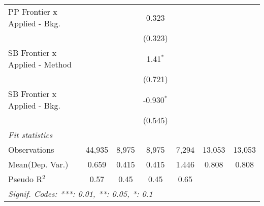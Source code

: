 \begin{tabular}{lcccccc}
   PP Frontier x Applied - Bkg.   &               &              & 0.323         &               &        &   \\   
                                  &               &              & (0.323)       &               &        &   \\   
   SB Frontier x Applied - Method &               &              & 1.41$^{*}$    &               &        &   \\   
                                  &               &              & (0.721)       &               &        &   \\   
   SB Frontier x Applied - Bkg.   &               &              & -0.930$^{*}$  &               &        &   \\   
                                  &               &              & (0.545)       &               &        &   \\   
   \midrule
   \emph{Fit statistics}\\
   Observations                   & 44,935        & 8,975        & 8,975         & 7,294         & 13,053 & 13,053\\  
Mean(Dep. Var.) & 0.659 & 0.415 & 0.415 & 1.446 & 0.808 & 0.808 \\
   Pseudo R$^2$                   & 0.57          & 0.45         & 0.45          & 0.65          &        & \\  
   \midrule \midrule
   \multicolumn{7}{l}{\emph{Signif. Codes: ***: 0.01, **: 0.05, *: 0.1}}\\
\end{tabular}
\par\endgroup
